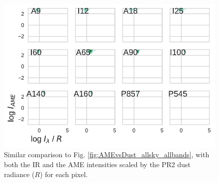         \begin{figure}
          \includegraphics[width=\textwidth]{../Plots/AMEvsDust_allsky_allbands__mpsub_Rnorm_kde.pdf}
          \centering
          \caption{Similar comparison to Fig. \ref{fig:AMEvsDust_allsky_allbands}, with both the IR and the AME intensities scaled by the PR2 dust radiance ($R$) for each pixel. }
          \label{fig:AMEtoRvsDusttoR_allsky_allbands}
        \end{figure}


